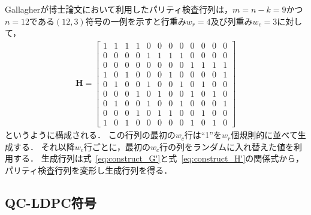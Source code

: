 \documentclass[twocolumn, a4paper]{ieicejsp}
\begin{document}
Gallagherが博士論文において利用したパリティ検査行列は，$m=n-k=9$かつ$n=12$である$(12,3)$符号の一例を示すと行重み$w_r=4$及び列重み$w_c=3$に対して，
\begin{align}
  \mathbf{H} = \left[\begin{array}{cccccccccccc}
    1&1&1&1&0&0&0&0&0&0&0&0 \\
    0&0&0&0&1&1&1&1&0&0&0&0 \\
    0&0&0&0&0&0&0&0&1&1&1&1 \\ \hline
    1&0&1&0&0&0&1&0&0&0&0&1 \\
    0&1&0&0&1&0&0&1&0&1&0&0 \\
    0&0&0&1&0&1&0&0&1&0&1&0 \\ \hline
    0&1&0&0&1&0&0&1&0&0&0&1 \\
    0&0&0&1&0&1&1&0&0&1&0&0 \\
    1&0&1&0&0&0&0&0&1&0&1&0
  \end{array} \right]
\end{align}
というように構成される．
この行列の最初の$w_c$行は``1''を$w_r$個規則的に並べて生成する．
それ以降$w_c$行ごとに，最初の$w_c$行の列をランダムに入れ替えた値を利用する．
生成行列は式~\eqref{eq:construct_G'}と式~\eqref{eq:construct_H'}の関係式から，パリティ検査行列を変形し生成行列を得る．



\subsection{QC-LDPC符号\cite{QCLDPC}}

\end{document}

